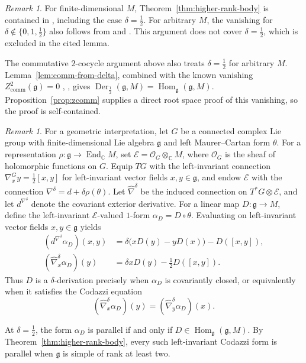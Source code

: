 \documentclass[11pt,reqno]{amsart}
\numberwithin{equation}{section}
\newcommand{\C}{\mathbb C}
\newcommand{\g}{\mathfrak g}
\DeclareMathOperator{\Der}{Der}
\DeclareMathOperator{\Hom}{Hom}
\DeclareMathOperator{\End}{End}
\theoremstyle{definition}
\theoremstyle{remark}
\newtheorem{remark}[theorem]{Remark}
\begin{document}
\begin{remark}\label{rem:higher-rank-literature}
For finite-dimensional \(M\), Theorem~\ref{thm:higher-rank-body} is
contained in \cite[Main Theorem]{ZZ21}, including the case
\(\delta=\frac{1}{2}\). For arbitrary \(M\), the vanishing for
\(\delta\notin\{0,1,\frac{1}{2}\}\) also follows from
\cite[Lemma~4.4]{Zus10} and \cite[proof of Corollary~2.5]{DZ10}.
This argument does not cover \(\delta=\frac{1}{2}\), which is
excluded in the cited lemma.

The commutative \(2\)-cocycle argument above also treats
\(\delta=\frac{1}{2}\) for arbitrary \(M\).
Lemma~\ref{lem:comm-from-delta}, combined with the known vanishing
\(Z^2_{\mathrm{comm}}(\g)=0\)
\cite[Theorem~1.1]{DB09}, \cite[Corollary~2.5]{DZ10}, gives
\(\Der_{\frac{1}{2}}(\g,M)=\Hom_\g(\g,M)\).
Proposition~\ref{prop:zcomm} supplies a direct root space proof
of this vanishing, so the proof is self-contained.
\end{remark}

\begin{remark}\label{rem:geometric-interpretation}
For a geometric interpretation, let \(G\) be a connected complex Lie group
with finite-dimensional
Lie algebra \(\g\) and left Maurer--Cartan form \(\theta\).
For a representation \(\rho:\g\to\End_\C M\), set
\(\mathcal E=\mathcal O_G\otimes_\C M\), where \(\mathcal O_G\)
is the sheaf of holomorphic functions on \(G\). Equip \(TG\) with the
left-invariant connection \(\nabla^G_x y=\frac{1}{2}[x,y]\) for
left-invariant vector fields \(x,y\in\g\), and endow \(\mathcal E\) with
the connection \(\nabla^\delta=d+\delta\rho(\theta)\).
Let \(\widehat\nabla^\delta\) be the induced connection on
\(T^*G\otimes\mathcal E\), and let \(d^{\nabla^\delta}\) denote
the covariant exterior derivative. For a linear map \(D:\g\to M\),
define the left-invariant \(\mathcal E\)-valued \(1\)-form
\(\alpha_D=D\circ\theta\). Evaluating on left-invariant vector fields
\(x,y\in\g\) yields
\[
\begin{aligned}
(d^{\nabla^\delta}\alpha_D)(x,y)
&=\delta\bigl(xD(y)-yD(x)\bigr)-D([x,y]),\\
(\widehat\nabla^\delta_x\alpha_D)(y)
&=\delta xD(y)-\frac{1}{2}D([x,y]).
\end{aligned}
\]
Thus \(D\) is a \(\delta\)-derivation precisely when \(\alpha_D\)
is covariantly closed, or equivalently when it satisfies the Codazzi equation
\[
(\widehat\nabla^\delta_x\alpha_D)(y)
=(\widehat\nabla^\delta_y\alpha_D)(x).
\]

At \(\delta=\frac{1}{2}\), the form \(\alpha_D\) is parallel if and only if
\(D\in\Hom_\g(\g,M)\). By Theorem~\ref{thm:higher-rank-body},
every such left-invariant Codazzi form is parallel when \(\g\) is simple of
rank at least two.
\end{remark}
\end{document}
